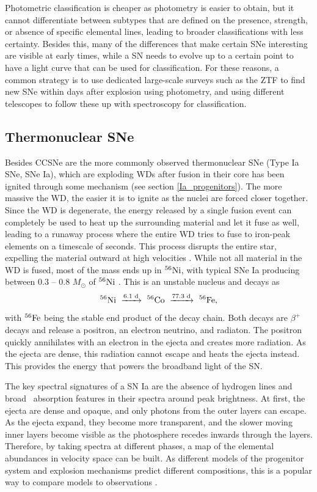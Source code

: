 \documentclass[a4paper,oneside,12pt, class=Latex/Classes/PhDthesisPSnPDF, crop=false]{standalone}
\begin{document}
Photometric classification is cheaper as photometry is easier to obtain, but it cannot differentiate between subtypes that are defined on the presence, strength, or absence of specific elemental lines, leading to broader classifications with less certainty. Besides this, many of the differences that make certain SNe interesting are visible at early times, while a SN needs to evolve up to a certain point to have a light curve that can be used for classification. For these reasons, a common strategy is to use dedicated large-scale surveys such as the ZTF to find new SNe within days after explosion using photometry, and using different telescopes to follow these up with spectroscopy for classification.

\subsection{Thermonuclear SNe}
\label{SNIa}
Besides CCSNe are the more commonly observed thermonuclear SNe (Type Ia SNe, SNe Ia), which are exploding WDs after fusion in their core has been ignited through some mechanism (see section \ref{Ia_progenitors}). The more massive the WD, the easier it is to ignite as the nuclei are forced closer together. Since the WD is degenerate, the energy released by a single fusion event can completely be used to heat up the surrounding material and let it fuse as well, leading to a runaway process where the entire WD tries to fuse to iron-peak elements on a timescale of seconds. This process disrupts the entire star, expelling the material outward at high velocities \citep{Ia_thermonuclear}. While not all material in the WD is fused, most of the mass ends up in $^{56}\text{Ni}$, with typical SNe Ia producing between 0.3 -- 0.8 $M_\odot$ of $^{56}\text{Ni}$ \citep{Ia_Ni56_yield}. This is an unstable nucleus and decays as
\begin{equation}
    \Nififtysix\ \xrightarrow{6.1\text{ d}}\ \Cofiftysix\ \xrightarrow{77.3\text{ d}}\ \Fefiftysix,
\end{equation}
with $^{56}\text{Fe}$ being the stable end product of the decay chain. Both decays are $\beta^+$ decays and release a positron, an electron neutrino, and radiaton. The positron quickly annihilates with an electron in the ejecta and creates more radiation. As the ejecta are dense, this radiation cannot escape and heats the ejecta instead. This provides the energy that powers the broadband light of the SN.

The key spectral signatures of a SN Ia are the absence of hydrogen lines and broad \SiII\ absorption features in their spectra around peak brightness. At first, the ejecta are dense and opaque, and only photons from the outer layers can escape. As the ejecta expand, they become more transparent, and the slower moving inner layers become visible as the photosphere recedes inwards through the layers. Therefore, by taking spectra at different phases, a map of the elemental abundances in velocity space can be built. As different models of the progenitor system and explosion mechanisms predict different compositions, this is a popular way to compare models to observations \citep[e.g.][]{ptf11kx,de_2019_18byg,2020sck_Iax,2021rhu}.
\end{document}
